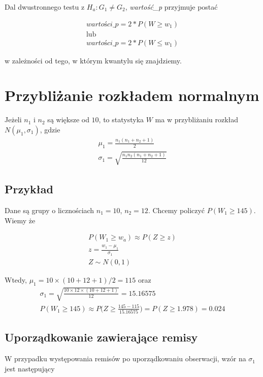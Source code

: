 \documentclass[a4paper]{article}
\begin{document}
Dal dwustronnego testu z $H_a : G_1 \neq G_2$, \textit{wartość\_p} przyjmuje postać

\begin{align}
     \textit{wartości\_p} = 2 * P(W \geq w_1) \\
     \text{lub}\\
     \textit{wartości\_p} = 2 * P(W \leq w_1)
\end{align}

w zależności od tego, w którym kwantylu się znajdziemy.

\section{Przybliżanie rozkładem normalnym}

Jeżeli $n_1$ i $n_2$ są większe od $10$, to statystyka $W$ ma w przybliżaniu rozkład $N(\mu_1, \sigma_1)$, gdzie
\begin{align}
    \mu_1 = \frac{n_1 (n_1 + n_2 + 1)}{2} \\
    \sigma_1 = \sqrt{\frac{n_1 n_2(n_1+n_2+1)}{12}}
\end{align}

\subsection{Przykład}

Dane są grupy o licznościach $n_1 = 10$, $n_2 = 12$. Chcemy policzyć $P(W_1 \geq 145)$. Wiemy że

\begin{align}
    P(W_1 \geq w_a) \approx P(Z \geq z) \\ 
    z = \frac{w_1 - \mu_1}{\sigma_1} \\
    Z \sim N(0, 1)
\end{align}

Wtedy, $\mu_1 = 10 \times (10 + 12 + 1)/ 2 = 115$ oraz 
\begin{align}
    \sigma_1 = \sqrt{\frac{10 \times 12 \times (10 + 12 + 1)}{12}} = 15.16575 \\
    P(W_1 \geq 145) \approx P \Big(Z \geq \frac{145-115}{15.16575}\Big) = P(Z \geq 1.978) = 0.024
\end{align}

\subsection{Uporządkowanie zawierające remisy}

W przypadku występowania remisów po uporządkowaniu obserwacji, wzór na $\sigma_1$ jest następujący
\end{document}
